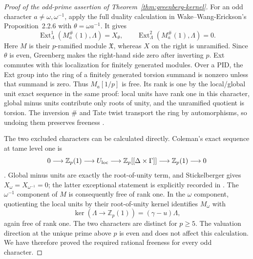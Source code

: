 \documentclass[11pt]{article}
\theoremstyle{definition}
\numberwithin{equation}{section}
\begin{document}
\begin{proof}[Proof of the odd-prime assertion of Theorem~\ref{thm:greenberg-kernel}]
For an odd character $a\ne\omega,\omega^{-1}$, apply the full
duality calculation in Wake--Wang-Erickson's Proposition~2.2.6
with $\theta=\omega a^{-1}$. It gives
\begin{equation}
 \operatorname{Ext}^1_\Lambda(M_a^{\#}(1),\Lambda)=X_\theta,
 \qquad
 \operatorname{Ext}^2_\Lambda(M_a^{\#}(1),\Lambda)=0.           \label{eq:gm7}
\end{equation}
Here $M$ is their $p$-ramified module $\mathfrak X$, whereas $X$
on the right is unramified. Since $\theta$ is even, Greenberg
makes the right-hand side zero after inverting $p$. Ext commutes
with this localization for finitely generated modules. Over a PID,
the Ext group into the ring of a finitely generated torsion summand
is nonzero unless that summand is zero. Thus $M_a[1/p]$ is free.
Its rank is one by the local/global unit exact sequence in the
same proof: local units have rank one in this character, global
minus units contribute only roots of unity, and the unramified
quotient is torsion. The inversion $\#$ and Tate twist transport
the ring by automorphisms, so undoing them preserves freeness
\cite[Proposition~2.2.6 and proof, pp.~3--4]{WakeWangErickson2017}.

The two excluded characters can be calculated directly.
Coleman's exact sequence at tame level one is
\begin{equation}
 0\longrightarrow\mathbb Z_p(1)\longrightarrow U_{\rm loc}
 \longrightarrow\mathbb Z_p[[\Delta\times\Gamma]]
 \longrightarrow\mathbb Z_p(1)\longrightarrow0
\end{equation}
\cite[Theorem~5.5.31, p.~148; Proposition~6.1.1,
pp.~151--152]{SharifiIwasawaNotes}.
Global minus units are exactly the root-of-unity term, and
Stickelberger gives $X_\omega=X_{\omega^{-1}}=0$; the latter
exceptional statement is explicitly recorded in
\cite[proof of Lemma~5.2.7, p.~13]{WakeWangErickson2017}.
The $\omega^{-1}$ component of $M$ is consequently free of rank
one. In the $\omega$ component, quotienting the local units by
their root-of-unity kernel identifies $M_\omega$ with
\begin{equation}
 \ker(\Lambda\longrightarrow\mathbb Z_p(1))
     =(\gamma-u)\Lambda,
\end{equation}
again free of rank one. The two characters are distinct for
$p\ge5$. The valuation direction at the unique prime above $p$
is even and does not affect this calculation. We have therefore
proved the required rational freeness for every odd character.


\end{proof}
\end{document}
